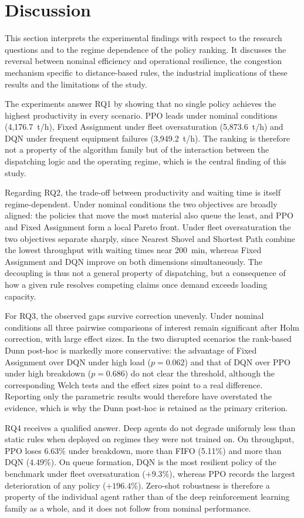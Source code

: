 \documentclass[11pt,a4paper]{article}
\begin{document}
\section{Discussion}
\label{sec:discussion}

This section interprets the experimental findings with respect to the research questions and to the regime dependence of the policy ranking. It discusses the reversal between nominal efficiency and operational resilience, the congestion mechanism specific to distance-based rules, the industrial implications of these results and the limitations of the study.

The experiments answer RQ1 by showing that no single policy achieves the highest productivity in every scenario. PPO leads under nominal conditions (4,176.7~t/h), Fixed Assignment under fleet oversaturation (5,873.6~t/h) and DQN under frequent equipment failures (3,949.2~t/h). The ranking is therefore not a property of the algorithm family but of the interaction between the dispatching logic and the operating regime, which is the central finding of this study.

Regarding RQ2, the trade-off between productivity and waiting time is itself regime-dependent. Under nominal conditions the two objectives are broadly aligned: the policies that move the most material also queue the least, and PPO and Fixed Assignment form a local Pareto front. Under fleet oversaturation the two objectives separate sharply, since Nearest Shovel and Shortest Path combine the lowest throughput with waiting times near 200~min, whereas Fixed Assignment and DQN improve on both dimensions simultaneously. The decoupling is thus not a general property of dispatching, but a consequence of how a given rule resolves competing claims once demand exceeds loading capacity.

For RQ3, the observed gaps survive correction unevenly. Under nominal conditions all three pairwise comparisons of interest remain significant after Holm correction, with large effect sizes. In the two disrupted scenarios the rank-based Dunn post-hoc is markedly more conservative: the advantage of Fixed Assignment over DQN under high load ($p=0.062$) and that of DQN over PPO under high breakdown ($p=0.686$) do not clear the threshold, although the corresponding Welch tests and the effect sizes point to a real difference. Reporting only the parametric results would therefore have overstated the evidence, which is why the Dunn post-hoc is retained as the primary criterion.

RQ4 receives a qualified answer. Deep agents do not degrade uniformly less than static rules when deployed on regimes they were not trained on. On throughput, PPO loses 6.63\% under breakdown, more than FIFO (5.11\%) and more than DQN (4.49\%). On queue formation, DQN is the most resilient policy of the benchmark under fleet oversaturation ($+9.3\%$), whereas PPO records the largest deterioration of any policy ($+196.4\%$). Zero-shot robustness is therefore a property of the individual agent rather than of the deep reinforcement learning family as a whole, and it does not follow from nominal performance.
\end{document}
